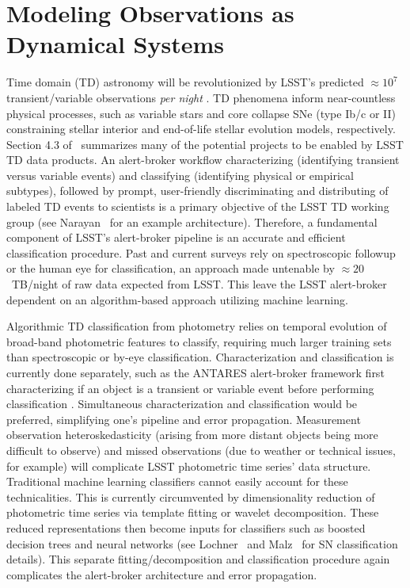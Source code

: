 \documentclass[modern]{aastex631}
\begin{document}
\section{Modeling Observations as Dynamical Systems}
Time domain (TD) astronomy will be revolutionized by LSST's predicted $\approx10^7$ transient/variable observations \textit{per night} \citep{Narayan2018}. 
TD phenomena inform near-countless physical processes, such as variable stars and core collapse SNe (type Ib/c or II) constraining stellar interior and end-of-life stellar evolution models, respectively. 
Section 4.3 of~\cite{Zeljko2019} summarizes many of the potential projects to be enabled by LSST TD data products. 
An alert-broker workflow characterizing (identifying transient versus variable events) and classifying (identifying physical or empirical subtypes), followed by prompt, user-friendly discriminating and distributing of labeled TD events to scientists is a primary objective of the LSST TD working group (see Narayan~\citeyear{Narayan2018} for an example architecture). 
Therefore, a fundamental component of LSST's alert-broker pipeline is an accurate and efficient classification procedure. 
Past and current surveys rely on spectroscopic followup or the human eye for classification, an approach made untenable by $\approx20$~TB/night of raw data expected from LSST. 
This leave the LSST alert-broker dependent on an algorithm-based approach utilizing machine learning.

Algorithmic TD classification from photometry relies on temporal evolution of broad-band photometric features to classify, requiring much larger training sets than spectroscopic or by-eye classification. 
Characterization and classification is currently done separately, such as the ANTARES alert-broker framework first characterizing if an object is a transient or variable event before performing classification \citep{Narayan2018}. 
Simultaneous characterization and classification would be preferred, simplifying one's pipeline and error propagation. 
Measurement observation heteroskedasticity (arising from more distant objects being more difficult to observe) and missed observations (due to weather or technical issues, for example) will complicate LSST photometric time series' data structure.
Traditional machine learning classifiers cannot easily account for these technicalities. 
This is currently circumvented by dimensionality reduction of photometric time series via template fitting or wavelet decomposition. 
These reduced representations then become inputs for classifiers such as boosted decision trees and neural networks (see Lochner~\citeyear{Lochner2016} and Malz~\citeyear{Malz2019} for SN classification details). 
This separate fitting/decomposition and classification procedure again complicates the alert-broker architecture and error propagation. 
\end{document}
